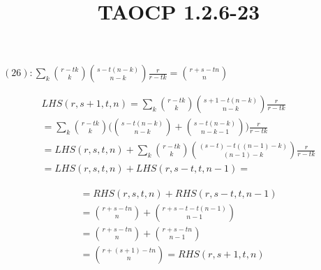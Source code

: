 \documentclass{article}
\title{TAOCP 1.2.6\mbox{-}23}
\begin{document}
\maketitle

\( (26): \sum_{k} \binom{r-tk}{k}\binom{s-t(n-k)}{n-k}\frac{r}{r-tk} = \binom{r+s-tn}{n} \)

\begin{multline*}
LHS(r, s+1, t, n) = \sum_{k} \binom{r-tk}{k}\binom{s+1-t(n-k)}{n-k}\frac{r}{r-tk} \\
= \sum_{k} \binom{r-tk}{k}\bigl(\binom{s-t(n-k)}{n-k} + \binom{s-t(n-k)}{n-k-1} \bigr)\frac{r}{r-tk} \\
= LHS(r,s,t,n) + \sum_{k} \binom{r-tk}{k}\binom{(s - t) - t((n-1)-k)}{(n-1)-k}\frac{r}{r-tk} \\
= LHS(r,s,t,n) + LHS(r,s-t,t,n-1) =
\end{multline*}

\begin{multline*}
= RHS(r,s,t,n) + RHS(r,s-t,t,n-1) \\
= \binom{r+s-tn}{n} + \binom{r+s-t-t(n-1)}{n-1} \\
= \binom{r+s-tn}{n} + \binom{r+s-tn}{n-1} \\
= \binom{r+(s+1)-tn}{n} = RHS(r,s+1,t,n)
\end{multline*}
\end{document}
